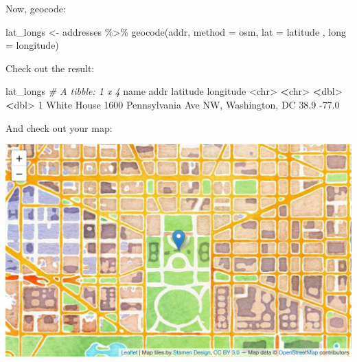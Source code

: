 \documentclass[
]{book}
\newenvironment{Shaded}{\begin{snugshade}}{\end{snugshade}}
\newcommand{\AttributeTok}[1]{\textcolor[rgb]{0.77,0.63,0.00}{#1}}
\newcommand{\CommentTok}[1]{\textcolor[rgb]{0.56,0.35,0.01}{\textit{#1}}}
\newcommand{\DecValTok}[1]{\textcolor[rgb]{0.00,0.00,0.81}{#1}}
\newcommand{\ErrorTok}[1]{\textcolor[rgb]{0.64,0.00,0.00}{\textbf{#1}}}
\newcommand{\FloatTok}[1]{\textcolor[rgb]{0.00,0.00,0.81}{#1}}
\newcommand{\FunctionTok}[1]{\textcolor[rgb]{0.00,0.00,0.00}{#1}}
\newcommand{\NormalTok}[1]{#1}
\newcommand{\OtherTok}[1]{\textcolor[rgb]{0.56,0.35,0.01}{#1}}
\newcommand{\SpecialCharTok}[1]{\textcolor[rgb]{0.00,0.00,0.00}{#1}}
\newcommand{\StringTok}[1]{\textcolor[rgb]{0.31,0.60,0.02}{#1}}
\begin{document}
Now, geocode:

\begin{Shaded}
\begin{Highlighting}[]
\NormalTok{lat\_longs }\OtherTok{\textless{}{-}}\NormalTok{ addresses }\SpecialCharTok{\%\textgreater{}\%}
    \FunctionTok{geocode}\NormalTok{(addr, }\AttributeTok{method =} \StringTok{\textquotesingle{}osm\textquotesingle{}}\NormalTok{, }\AttributeTok{lat =}\NormalTok{ latitude , }\AttributeTok{long =}\NormalTok{ longitude)}
\end{Highlighting}
\end{Shaded}

Check out the result:

\begin{Shaded}
\begin{Highlighting}[]
\NormalTok{lat\_longs}
\CommentTok{\# A tibble: 1 x 4}
\NormalTok{  name        addr                                     latitude longitude}
  \SpecialCharTok{\textless{}}\NormalTok{chr}\SpecialCharTok{\textgreater{}}       \ErrorTok{\textless{}}\NormalTok{chr}\SpecialCharTok{\textgreater{}}                                       \ErrorTok{\textless{}}\NormalTok{dbl}\SpecialCharTok{\textgreater{}}     \ErrorTok{\textless{}}\NormalTok{dbl}\SpecialCharTok{\textgreater{}}
\DecValTok{1}\NormalTok{ White House }\DecValTok{1600}\NormalTok{ Pennsylvania Ave NW, Washington, DC     }\FloatTok{38.9}     \SpecialCharTok{{-}}\FloatTok{77.0}
\end{Highlighting}
\end{Shaded}

And check out your map:

\begin{Shaded}
\end{Shaded}

\includegraphics{figures/unnamed-chunk-226-1.pdf}
\end{document}

